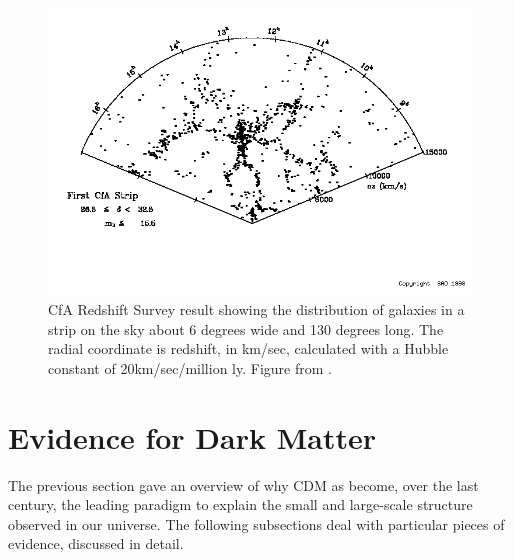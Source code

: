 \begin{figure}[htbp]
\begin{center}
\includegraphics[width=\textwidth]{figures/theory/cfa.png}
\caption{CfA Redshift Survey result showing the distribution of galaxies in a strip on the sky about 6 degrees wide and 130 degrees long. The radial coordinate is redshift, in km/sec, calculated with a Hubble constant of 20km/sec/million ly. Figure from \cite{cfasite}. }
\label{fig:cfa}
\end{center}
\end{figure}


\section{Evidence for Dark Matter}
The previous section gave an overview of why \ac{CDM} as become, over the last century, the leading paradigm to explain the small and large-scale structure observed in our universe. The following subsections deal with particular pieces of evidence, discussed in detail.

